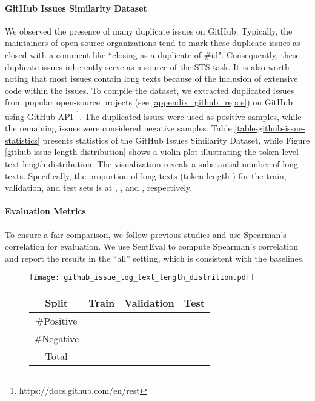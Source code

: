 \documentclass{article} \usepackage{iclr2024_conference,times}
\begin{document}
\paragraph{GitHub Issues Similarity Dataset}
We observed the presence of many duplicate issues on GitHub. Typically, the maintainers of open source organizations tend to mark these duplicate issues as closed with a comment like ``closing as a duplicate of \#id". Consequently, these duplicate issues inherently serve as a source of the STS task. It is also worth noting that most issues contain long texts because of the inclusion of extensive code within the issues.
To compile the dataset, we extracted duplicated issues from  popular open-source projects (see \ref{appendix_github_repos}) on GitHub using GitHub API \footnote{https://docs.github.com/en/rest}. The duplicated issues were used as positive samples, while the remaining issues were considered negative samples. Table \ref{table-github-issue-statistics} presents statistics of the GitHub Issues Similarity Dataset, while Figure \ref{github-issue-length-distribution} shows a violin plot illustrating the token-level text length distribution. The visualization reveals a substantial number of long texts. Specifically, the proportion of long texts (token length )  for the train, validation, and test sets is at , , and , respectively.

\paragraph{Evaluation Metrics} To ensure a fair comparison, we follow previous studies and use Spearman's correlation for evaluation. We use SentEval \citep{conneau-kiela-2018-senteval} to compute Spearman's correlation and report the results in the ``all'' setting, which is consistent with the baselines.

\begin{figure}\CenterFloatBoxes
\begin{floatrow}
{
    \texttt{[image: github\_issue\_log\_text\_length\_distrition.pdf]}
}
\killfloatstyle{}
{
    \begin{tabular}{c||ccc}
    \toprule
            Split & Train & Validation & Test \\
    \midrule
    \#Positive &  &  &  \\
    \#Negative &  &  &  \\
    \midrule
    Total &  &  &  \\
    \bottomrule
    \end{tabular}
}
\end{floatrow}
\end{figure}
\end{document}

